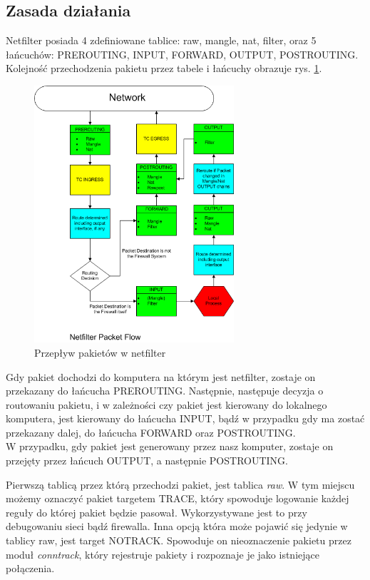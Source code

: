 \documentclass[a4paper,12pt,oneside]{book}
\begin{document}
		\subsection{Zasada działania}
			Netfilter posiada 4 zdefiniowane tablice: raw, mangle, nat, filter, oraz 5 łańcuchów: PREROUTING, INPUT, FORWARD, OUTPUT, POSTROUTING.
			Kolejność przechodzenia pakietu przez tabele i łańcuchy obrazuje rys. \ref{fig:flowchart}.\\
			\begin{figure}[h]
				\centering
					\includegraphics[width=280px]{Netfilter.png}
					\caption{Przepływ pakietów w netfilter}
					\label{fig:flowchart}
			\end{figure}
			Gdy pakiet dochodzi do komputera na którym jest netfilter, zostaje on przekazany do łańcucha PREROUTING. Następnie, następuje decyzja o routowaniu pakietu, i w zależności czy pakiet jest kierowany do lokalnego komputera, jest kierowany do łańcucha INPUT, bądź w przypadku gdy ma zostać przekazany dalej, do łańcucha FORWARD oraz POSTROUTING.\\
			W przypadku, gdy pakiet jest generowany przez nasz komputer, zostaje on przejęty przez łańcuch OUTPUT, a następnie POSTROUTING.

			Pierwszą tablicą przez którą przechodzi pakiet, jest tablica \textit{raw}. W tym miejscu możemy oznaczyć pakiet targetem TRACE, który spowoduje logowanie każdej reguły do której pakiet będzie pasował. Wykorzystywane jest to przy debugowaniu sieci bądź firewalla.
			Inna opcją która może pojawić się jedynie w tablicy raw, jest target NOTRACK. Spowoduje on nieoznaczenie pakietu przez moduł \textit{conntrack}, który rejestruje pakiety i rozpoznaje je jako istniejące połączenia.
\end{document}
